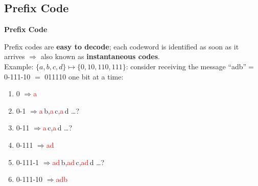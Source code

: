 \documentclass[compress]{beamer}        %
\makeatletter
\newcommand{\tcb}{\textcolor{beamer@blendedblue}}
\newcommand{\tcr}{\textcolor{red}}
\makeatother
\begin{document}
\subsection{Prefix Code}
\begin{frame}{\bf \tcb{Prefix Code}}

Prefix codes are {\bf easy to decode}; each codeword is identified as soon as it arrives $\Rightarrow$ also known as {\bf instantaneous codes}.\\[0.5cm]

Example: $\{a,b,c,d\} \mapsto \{0,10,110,111\}$: consider receiving the message ``adb''$=$ 0-111-10 $=$ 011110 one bit at a time:\\[0.1cm]
\begin{enumerate}[1.]\itemsep0.25cm
\item 0 \quad$\Rightarrow$\quad \tcr{a}
\item 0-1 \quad$\Rightarrow$\quad \tcr{a}\,b,\quad \tcr{a}\,c,\quad \tcr{a}\,d \ldots?
\item 0-11 \quad$\Rightarrow$\quad \tcr{a}\,c,\quad \tcr{a}\,d \ldots?
\item 0-111 \quad$\Rightarrow$\quad \tcr{ad}
\item 0-111-1 \quad$\Rightarrow$\quad \tcr{ad}\,b,\quad \tcr{ad}\,c,\quad \tcr{ad}\,d \ldots?
\item 0-111-10 \quad$\Rightarrow$\quad \tcr{adb}
\end{enumerate}

\end{frame}
\end{document}
